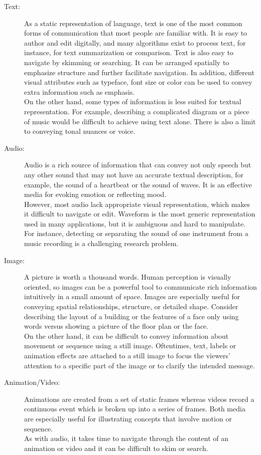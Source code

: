 \begin{description}
\item[Text:] As a static representation of language, text is one of the most common forms of communication that most people are familiar with. It is easy to author and edit digitally, and many algorithms exist to process text, for instance, for text summarization or comparison. Text is also easy to navigate by skimming or searching. It can be arranged spatially to emphasize structure and further facilitate navigation. In addition, different visual attributes such as typeface, font size or color can be used to convey extra information such as emphasis.\\
On the other hand, some types of information is less suited for textual representation. For example, describing a complicated diagram or a piece of music would be difficult to achieve using text alone. There is also a limit to conveying tonal nuances or voice. \\
\item[Audio:] Audio is a rich source of information that can convey not only speech but any other sound that may not have an accurate textual description, for example, the sound of a heartbeat or the sound of waves. It is an effective media for evoking emotion or reflecting mood.\\
However, most audio lack appropriate visual representation, which makes it difficult to navigate or edit. Waveform is the most generic representation used in many applications, but it is ambiguous and hard to manipulate. For instance, detecting or separating the sound of one instrument from a music recording is a challenging research problem.\\
\item[Image:] A picture is worth a thousand words. Human perception is visually oriented, so images can be a powerful tool to communicate rich information intuitively in a small amount of space. Images are especially useful for conveying spatial relationships, structure, or detailed shape. Consider describing the layout of a building or the features of a face only using words versus showing a picture of the floor plan or the face.\\ 
On the other hand, it can be difficult to convey information about movement or sequence using a still image. Oftentimes, text, labels or animation effects are attached to a still image to focus the viewers' attention to a specific part of the image or to clarify the intended message.\\
\item[Animation/Video:] Animations are created from a set of static frames whereas videos record a continuous event which is broken up into a series of frames. Both media are especially useful for illustrating concepts that involve motion or sequence.\\
As with audio, it takes time to navigate through the content of an animation or video and it can be difficult to skim or search.
\end{description}


